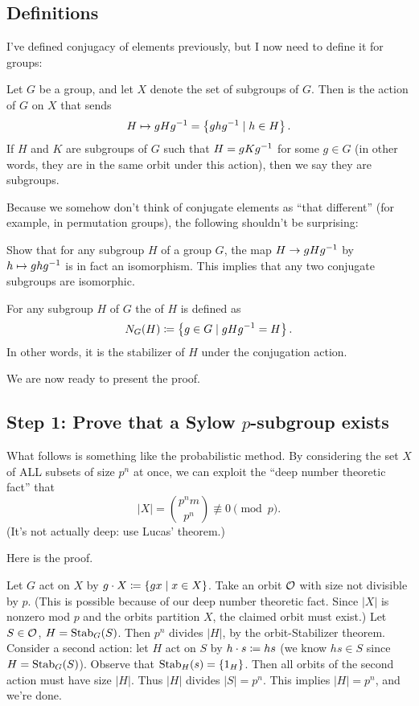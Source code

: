 \subsection{Definitions}
I've defined conjugacy of elements previously,
but I now need to define it for groups:
\begin{definition}
	Let $G$ be a group, and let $X$ denote the set of subgroups of $G$.
	Then  is the action of $G$ on $X$ that sends
	\[ H \mapsto gHg^{-1} = \left\{ ghg^{-1} \mid h \in H \right\}. \]
	If $H$ and $K$ are subgroups of $G$ such that $H = gKg^{-1}$ for some $g \in G$
	(in other words, they are in the same orbit under this action),
	then we say they are  subgroups.
\end{definition}

Because we somehow don't think of conjugate elements as
``that different'' (for example, in permutation groups),
the following shouldn't be surprising:
\begin{ques}
	Show that for any subgroup $H$ of a group $G$, the map $H \to gHg^{-1}$ by
	$h \mapsto ghg^{-1}$ is in fact an isomorphism.
	This implies that any two conjugate subgroups are isomorphic.
\end{ques}

\begin{definition}
	For any subgroup $H$ of $G$ the  of $H$ is defined as
	\[ N_G(H) \coloneqq \left\{ g \in G \mid gHg^{-1} = H \right\}. \]
	In other words, it is the stabilizer of $H$ under the conjugation action.
\end{definition}

We are now ready to present the proof.

\subsection{Step 1: Prove that a Sylow $p$-subgroup exists}
What follows is something like the probabilistic method.
By considering the set $X$ of ALL subsets of size $p^n$ at once, we can exploit the ``deep number theoretic fact'' that 
\[ \left\lvert X \right\rvert = \binom{p^n m}{p^n} \not\equiv 0 \pmod p. \]
(It's not actually deep: use Lucas' theorem.)

Here is the proof.
\begin{itemize}
	\ii Let $G$ act on $X$ by $g \cdot X \coloneqq \left\{ gx \mid x \in X \right\}$.
	\ii Take an orbit $\mathcal O$ with size not divisible by $p$.
	(This is possible because of our deep number theoretic fact.
	Since $\left\lvert X \right\rvert$ is nonzero mod $p$ and the orbits partition $X$,
	the claimed orbit must exist.)
	\ii Let $S \in \mathcal O$, $H = \operatorname{Stab}_G(S)$.
	Then $p^n$ divides $\left\lvert H \right\rvert$, by the orbit-Stabilizer theorem.
	\ii Consider a second action: let $H$ act on $S$ by 
	$h \cdot s \coloneqq hs$ (we know $hs \in S$ since $H = \operatorname{Stab}_G(S)$).
	\ii
	Observe that $\operatorname{Stab}_H(s) = \{1_H\}$.
	Then all orbits of the second action must have size $\left\lvert H \right\rvert$. Thus $\left\lvert H \right\rvert$ divides $\left\lvert S \right\rvert = p^n$.
	\ii This implies $\left\lvert H \right\rvert = p^n$, and we're done.
\end{itemize}


